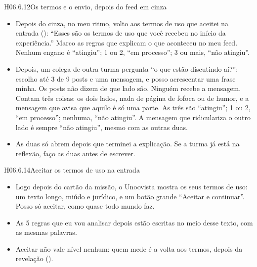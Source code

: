 \begin{historia}{H06.6.12}{Os termos e o envio, depois do feed em cinza}{\pronto}
\aceite
\begin{itemize}
  \item Depois do cinza, no meu ritmo, volto aos termos de uso que aceitei na
    entrada (): \enquote{Esses são os termos de uso que você
    recebeu no início da experiência.} Marco as regras que explicam o que
    aconteceu no meu feed. Nenhum engano é \enquote{atingiu}; 1 ou 2,
    \enquote{em processo}; 3 ou mais, \enquote{não atingiu}.
  \item Depois, um colega de outra turma pergunta \enquote{o que estão
    discutindo aí?}: escolho até 3 de 9 posts e uma mensagem, e posso
    acrescentar uma frase minha. Os posts não dizem de que lado são.
    Ninguém recebe a mensagem. Contam três coisas: os dois lados, nada de
    página de fofoca ou de humor, e a mensagem que avisa que aquilo é só uma
    parte. As três são \enquote{atingiu}; 1 ou 2, \enquote{em processo};
    nenhuma, \enquote{não atingiu}. A mensagem que ridiculariza o outro lado
    é sempre \enquote{não atingiu}, mesmo com as outras duas.
  \item As duas só abrem depois que terminei a explicação. Se a turma já está
    na reflexão, faço as duas antes de escrever.
\end{itemize}
\end{historia}

\begin{historia}{H06.6.14}{Aceitar os termos de uso na entrada}{\pronto}
\aceite
\begin{itemize}
  \item Logo depois do cartão da missão, o Unoovista mostra os seus termos de
    uso: um texto longo, miúdo e jurídico, e um botão grande
    \enquote{Aceitar e continuar}. Posso só aceitar, como quase todo mundo faz.
  \item As 5 regras que eu vou analisar depois estão escritas no meio desse
    texto, com as mesmas palavras.
  \item Aceitar não vale nível nenhum: quem mede é a volta aos termos, depois
    da revelação ().
\end{itemize}
\end{historia}


